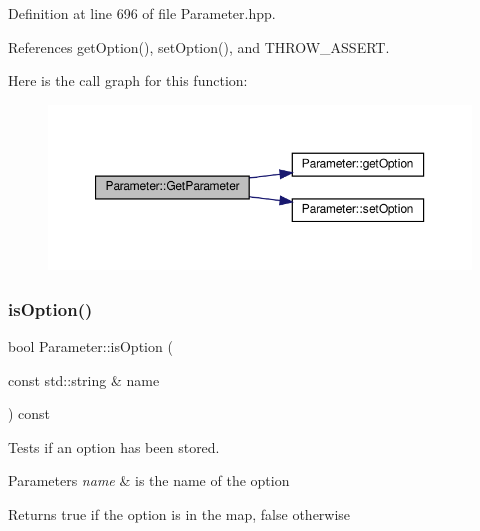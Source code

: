 Definition at line 696 of file Parameter.\+hpp.



References get\+Option(), set\+Option(), and T\+H\+R\+O\+W\+\_\+\+A\+S\+S\+E\+RT.

Here is the call graph for this function\+:
\nopagebreak
\begin{figure}[H]
\begin{center}
\leavevmode
\includegraphics[width=350pt]{dc/dab/classParameter_ac3f1eab3305dc5d06a411e632aa607c4_cgraph}
\end{center}
\end{figure}
\mbox{\label{classParameter_afa6f9cfedd547207f6742a0cd51eacfa}} 
\subsubsection{\texorpdfstring{is\+Option()}{isOption()}\hspace{0.1cm}{\footnotesize\ttfamily [1/3]}}
{\footnotesize\ttfamily bool Parameter\+::is\+Option (\begin{DoxyParamCaption}\item[{const std\+::string \&}]{name }\end{DoxyParamCaption}) const\hspace{0.3cm}{\ttfamily [inline]}}



Tests if an option has been stored. 


\begin{DoxyParams}{Parameters}
{\em name} & is the name of the option \\
\hline
\end{DoxyParams}
\begin{DoxyReturn}{Returns}
true if the option is in the map, false otherwise 
\end{DoxyReturn}


